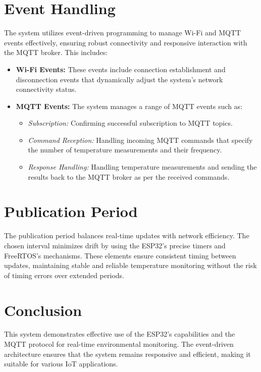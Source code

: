 \documentclass[
  article,
  10pt,
  a4paper,
  oneside,
  openany,
  twocolumn
]{memoir}
\begin{document}
\chapter{Event Handling}
The system utilizes event-driven programming to manage Wi-Fi and MQTT events effectively, ensuring robust connectivity and responsive interaction with the MQTT broker. This includes:

\begin{itemize}
    \item \textbf{Wi-Fi Events:} These events include connection establishment and disconnection events that dynamically adjust the system's network connectivity status.
    \item \textbf{MQTT Events:} The system manages a range of MQTT events such as:
        \begin{itemize}
            \item \textit{Subscription:} Confirming successful subscription to MQTT topics.
            \item \textit{Command Reception:} Handling incoming MQTT commands that specify the number of temperature measurements and their frequency.
            \item \textit{Response Handling:} Handling temperature measurements and sending the results back to the MQTT broker as per the received commands.
        \end{itemize}
\end{itemize}

\chapter{Publication Period}
The publication period balances real-time updates with network efficiency. The chosen interval minimizes drift by using the ESP32's precise timers and FreeRTOS's mechanisms. These elements ensure consistent timing between updates, maintaining stable and reliable temperature monitoring without the risk of timing errors over extended periods.

\chapter{Conclusion}
This system demonstrates effective use of the ESP32's capabilities and the MQTT protocol for real-time environmental monitoring. The event-driven architecture ensures that the system remains responsive and efficient, making it suitable for various IoT applications.
\end{document}
